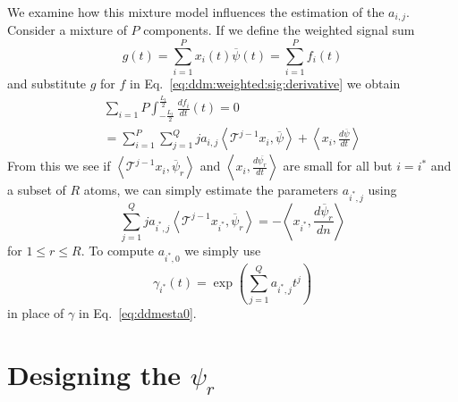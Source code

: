 \documentclass[twoside,a4paper]{article}
\begin{document}
We examine how this mixture model influences the estimation of the $a_{i,j}$.
Consider a mixture of $P$ components.
If we define the weighted signal sum
%
\[
    g(t) = \sum_{i=1}^{P} x_{i}(t) \overline{\psi}(t) = \sum_{i=1}^{P} f_{i}(t)
\]
%
and substitute $g$ for $f$ in Eq.~\ref{eq:ddm:weighted:sig:derivative} we obtain
%
\begin{multline}
    \label{eq:mixest}
    \sum_{i=1}{P} \int_{-\frac{L_{t}}{2}}^{\frac{L_{t}}{2}} \frac{df_{i}}{dt}(t) =
    0
    \\ = 
    \sum_{i=1}^{P}
    \sum_{j=1}^{Q} j a_{i,j} 
    \left\langle \mathcal{T}^{j-1} x_i , \overline{\psi} \right\rangle
     + \left\langle x_i, \frac{d\overline{\psi}}{dt} \right\rangle
\end{multline}
%
From this we see if $\left\langle \mathcal{T}^{j-1} x_i , \overline{\psi}_{r}
\right\rangle$ and $\left\langle x_i, \frac{d\overline{\psi_{r}}}{dt} \right\rangle$
are small for all but $i = i^{\ast}$ and a subset of $R$ atoms, we
can simply estimate the parameters $a_{i^{\ast},j}$ using
\[
    \sum_{j=1}^{Q} j a_{{i^{\ast}},j} 
    \left\langle \mathcal{T}^{j-1} x_{i^{\ast}} , \overline{\psi}_{r} \right\rangle
    = -\left\langle x_{i^{\ast}}, \frac{d\overline{\psi}_{r}}{dn} \right\rangle
\]
for $1 \leq r \leq R$. To compute $a_{i^{\ast},0}$ we simply use
\[
    \gamma_{i^{\ast}}(t) = \exp \left( \sum_{j=1}^{Q} a_{i^{\ast},j} t^{j} \right)
\]
in place of $\gamma$ in Eq.~\ref{eq:ddmesta0}.

\section{Designing the $\psi_{r}$}
\label{sec:designingatoms}
\end{document}
